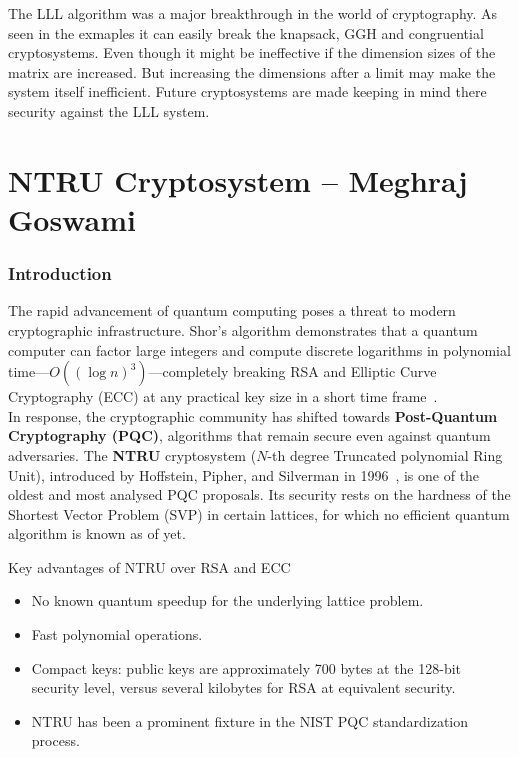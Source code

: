\documentclass[12pt, a4paper]{article}
\theoremstyle{definition}
\theoremstyle{plain}
\begin{document}
The LLL algorithm was a major breakthrough in the world of cryptography. As seen in the exmaples it can easily break the knapsack, GGH and congruential cryptosystems. Even though it might be ineffective if the dimension sizes of the matrix are increased. But increasing the dimensions after a limit may make the system itself inefficient. Future cryptosystems are made keeping in mind there security against the LLL system.

\newpage


\part{NTRU Cryptosystem -- Meghraj Goswami}

\section{Introduction}

The rapid advancement of quantum computing poses a threat to modern cryptographic infrastructure. Shor's algorithm demonstrates that a quantum computer can factor large integers and compute discrete logarithms in polynomial time---$O((\log n)^3)$---completely breaking RSA and Elliptic Curve Cryptography (ECC) at any practical key size in a short time frame~\cite{shor94}.\\

In response, the cryptographic community has shifted towards \textbf{Post-Quantum Cryptography (PQC)}, algorithms that remain secure even against quantum adversaries. The \textbf{NTRU} cryptosystem ($N$-th degree Truncated polynomial Ring Unit), introduced by Hoffstein, Pipher, and Silverman in 1996~\cite{ntru96}, is one of the oldest and most analysed PQC proposals. Its security rests on the hardness of the Shortest Vector Problem (SVP) in certain lattices, for which no efficient quantum algorithm is known as of yet.

Key advantages of NTRU over RSA and ECC\:
\begin{itemize}
    \item No known quantum speedup for the underlying lattice problem.
    \item Fast polynomial operations.
    \item Compact keys: public keys are approximately 700 bytes at the 128-bit security level, versus several kilobytes for RSA at equivalent security.
    \item NTRU has been a prominent fixture in the NIST PQC standardization process.\cite{nistpqc}
\end{itemize}
\end{document}

